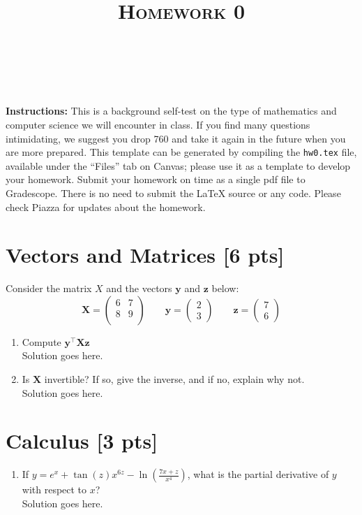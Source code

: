 \documentclass[a4paper]{article}
\title{\textsc{Homework 0}} %
\author{
\red{$>>$NAME HERE$<<$} \\
\red{$>>$ID HERE$<<$}\\
}
\date{}
\theoremstyle{definition}
\newenvironment{soln}{
    \leavevmode\color{blue}\ignorespaces
}{}
\begin{document}
\maketitle 


\textbf{Instructions:} 
This is a background self-test on the type of mathematics and computer science we will encounter in class. If you find many questions intimidating, we suggest you drop 760 and take it again in the future when you are more prepared.
This template can be generated by compiling the {\tt hw0.tex} file, available under the ``Files'' tab on Canvas;
please use it as a template to develop your homework.
Submit your homework on time as a single pdf file to Gradescope.
There is no need to submit the LaTeX source or any code.
Please check Piazza for updates about the homework.


\section{Vectors and Matrices [6 pts]}
Consider the matrix $X$ and the vectors $\mathbf{y}$ and $\textbf{z}$ below:
$$
\mathbf X = \begin{pmatrix}
6 & 7 \\ 8 & 9 \\
\end{pmatrix}
\qquad \mathbf{y} = \begin{pmatrix}
2 \\ 3
\end{pmatrix} \qquad \mathbf{z} = \begin{pmatrix}
7 \\ 6
\end{pmatrix}
$$
\begin{enumerate}
	\item 	Compute $\mathbf{y}^\top \mathbf X \mathbf{z}$\\
	    \begin{soln} Solution goes here. \end{soln}
	\item 	Is $\mathbf X$ invertible? If so, give the inverse, and if no, explain why not.\\
        \begin{soln}  Solution goes here. \end{soln}
\end{enumerate}


\section{Calculus [3 pts]}
\begin{enumerate}
	\item If $y = e^x + \tan(z)x^{6z} - \ln(\frac{7x + z}{x^{4}})$, what is the partial derivative of $y$ with respect to $x$?\\
	\begin{soln}  Solution goes here. \end{soln}
\end{enumerate}
\end{document}
